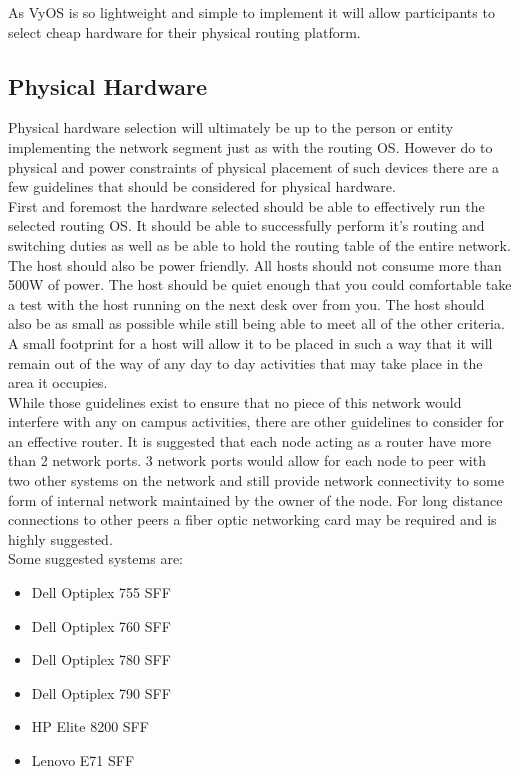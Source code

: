 \documentclass[12pt]{article}
\begin{document}
As VyOS is so lightweight and simple to implement it will allow participants to select cheap hardware for their physical routing platform. 


\subsection{Physical Hardware}

Physical hardware selection will ultimately be up to the person or entity implementing the network segment just as with the routing OS. However
do to physical and power constraints of physical placement of such devices there are a few guidelines that should be considered for physical hardware.
\\

First and foremost the hardware selected should be able to effectively run the selected routing OS. It should be able to successfully perform it's routing
and switching duties as well as be able to hold the routing table of the entire network. The host should also be power friendly. All hosts should not consume
more than 500W of power. The host should be quiet enough that you could comfortable take a test with the host running on the next desk over from you. The host
should also be as small as possible while still being able to meet all of the other criteria. A small footprint for a host will allow it to be placed in such
a way that it will remain out of the way of any day to day activities that may take place in the area it occupies.
\\

While those guidelines exist to ensure that no piece of this network would interfere with any on campus activities, there are other guidelines to consider
for an effective router. It is suggested that each node acting as a router have more than 2 network ports. 3 network ports would allow for each node to peer
with two other systems on the network and still provide network connectivity to some form of internal network maintained by the owner of the node. For long
distance connections to other peers a fiber optic networking card may be required and is highly suggested.
\\

Some suggested systems are:

\begin{itemize}
	\item Dell Optiplex 755 SFF
	\item Dell Optiplex 760 SFF
	\item Dell Optiplex 780 SFF
	\item Dell Optiplex 790 SFF
	\item HP Elite 8200 SFF
	\item Lenovo E71 SFF
\end{itemize}
\end{document}
